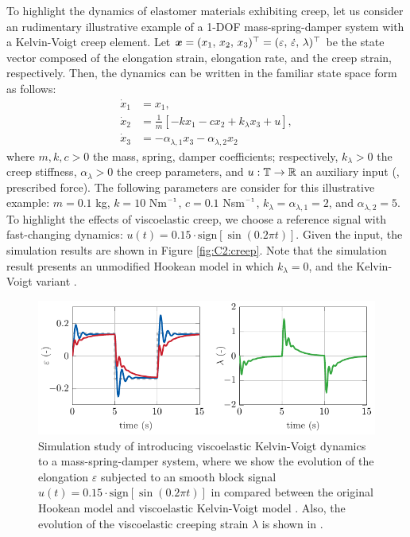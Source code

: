 \begin{example} To highlight the dynamics of elastomer materials exhibiting creep, let us consider an rudimentary illustrative example of a 1-DOF mass-spring-damper system with a Kelvin-Voigt creep element. Let ${\boldsymbol{x}} = (x_1,\,x_2,\,x_3)^\top = (\varepsilon,\, \dot{\varepsilon},\, \lambda)^\top$ be the state vector composed of the elongation strain, elongation rate, and the creep strain, respectively. Then, the dynamics can be written in the familiar state space form as follows:
%
\begin{align}
\dot{x}_1 & = x_1, \\
\dot{x}_2 & = \frac{1}{m}\left[ -k x_1 - c x_2 + k_\lambda x_3 + u \right], \\
\dot{x}_3 & = -\alpha_{\lambda,1}x_3 -\alpha_{\lambda,2}x_2
\end{align}
%
where $m,k,c>0$  the mass, spring, damper coefficients; respectively, $k_{\lambda}>0$ the creep stiffness, $\alpha_{\lambda}>0$ the creep parameters, and $u: \mathbb{T} \to \mathbb{R}$ an auxiliary input (\ie, prescribed force). The following parameters are consider for this illustrative example: $m = 0.1$ \si{\kilo \gram}, $k = 10$ Nm$\inv$, $c = 0.1$ Nsm$\inv$, $k_{\lambda} = \alpha_{\lambda,1} = 2$, and $\alpha_{\lambda,2} = 5$.  To highlight the effects of viscoelastic creep, we choose a reference signal with fast-changing dynamics: $u(t) = 0.15\cdot \textrm{sign}\left[ \sin(0.2\pi t) \right]$. Given the input, the simulation results are shown in Figure \ref{fig:C2:creep}. Note that the simulation result presents an unmodified Hookean model  in which $k_\lambda = 0$, and the Kelvin-Voigt variant .
%
\begin{figure}[!t]
   \includegraphics*{./pdf/thesis-figure-4-10.pdf}
   \vspace{-0.2cm}
   \caption{Simulation study of introducing viscoelastic Kelvin-Voigt dynamics to a mass-spring-damper system, where we show the evolution of the elongation $\varepsilon$ subjected to an smooth block signal $u(t) = 0.15\cdot \textrm{sign}\left[ \sin(0.2\pi t) \right]$ in  compared between the original Hookean model  and viscoelastic Kelvin-Voigt model . Also, the evolution of the viscoelastic creeping strain $\lambda$ is shown in .}

\end{figure}
\end{example}

